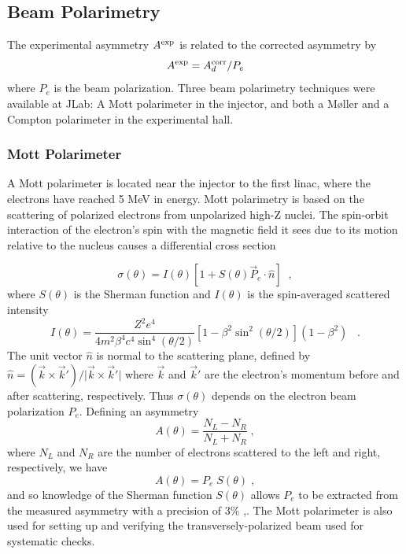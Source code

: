 \subsection{Beam Polarimetry}
\label{sec:beam_pol}
The experimental asymmetry $A^{\rm exp}$ is related 
to the corrected asymmetry by 
\begin{equation}
A^{\rm exp}=A^{\rm corr}_d/P_e
\label{eq:a_exp}
\end{equation}
where $P_e$ is the beam polarization. 
Three beam polarimetry techniques were available at JLab: 
A Mott polarimeter in the injector, and both a M{\o}ller
and a Compton polarimeter in the experimental hall.

\subsubsection{Mott Polarimeter}
\label{sec:mpt_exp_meth}
A Mott polarimeter \cite{Price}
is located near the injector to the first linac, where the
electrons have reached 5 MeV in energy. Mott polarimetry is based on the 
scattering of polarized electrons from unpolarized high-Z nuclei. The
spin-orbit interaction of the electron's spin with the magnetic field it sees due to its
motion relative to the nucleus causes a differential cross section

\begin{equation}\label{mottcrosssection}
\sigma(\theta) = I(\theta)
\left[1 + S(\theta){\vec P_e}\cdot \widehat{n}\right]\;\;,
\end{equation}
where $S(\theta)$ is the Sherman function
and 
$I(\theta)$ is the spin-averaged scattered intensity
\begin{equation}
I(\theta)= \frac{Z^2 e^4}{4m^2\beta^4 c^4 \sin^4(\theta/2)} \left[1 - \beta^2\sin^2(\theta/2)\right](1 - \beta^2) \;\;\; .
\end{equation}
 The unit vector ${\widehat n}$ is normal to the scattering plane, defined by
$
\widehat n = (\vec k \times \vec k')/\vert \vec k \times \vec k' \vert
$
where $\vec k$ and $\vec k'$ are the electron's momentum before and
after scattering, respectively. Thus $\sigma(\theta)$ depends on the electron beam polarization $P_e$.
Defining an asymmetry
\begin{equation}
A(\theta) = \frac{N_L - N_R}{N_L + N_R} \; ,
\end{equation}
where $N_L$ and $N_R$ are the number of electrons scattered to the left and
right, respectively, we have 
\begin{equation}
A(\theta) = P_e \; S(\theta) \;,
\end{equation}
and so knowledge of the Sherman function $S(\theta)$
allows $P_e$ to be extracted from the measured asymmetry
with a precision of 3\% \cite{Sinclair1},\cite{HAPPEXsff}.
The Mott polarimeter is also used for setting up and verifying
the transversely-polarized beam used for systematic checks.

